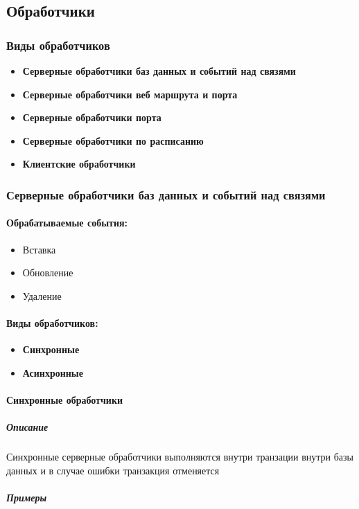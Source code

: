 \subsection{Обработчики}
\subsubsection{Виды обработчиков}
\begin{itemize}
  \item \textbf{Серверные обработчики баз данных и событий над связями}
  \item \textbf{Серверные обработчики веб маршрута и порта}
  \item \textbf{Серверные обработчики порта}
  \item \textbf{Серверные обработчики по расписанию}
  \item \textbf{Клиентские обработчики}
\end{itemize}

\subsubsection{Серверные обработчики баз данных и событий над связями}
\paragraph{Обрабатываемые события:}
\begin{itemize}
  \item Вставка
  \item Обновление
  \item Удаление
\end{itemize}
\paragraph{Виды обработчиков:}
\begin{itemize}
  \item \textbf{Синхронные}
  \item \textbf{Асинхронные}
\end{itemize}
\paragraph{Синхронные обработчики}
\subparagraph{Описание}

Синхронные серверные обработчики выполняются внутри транзации внутри базы
данных и в случае ошибки
транзакция отменяется
\subparagraph{Примеры}

